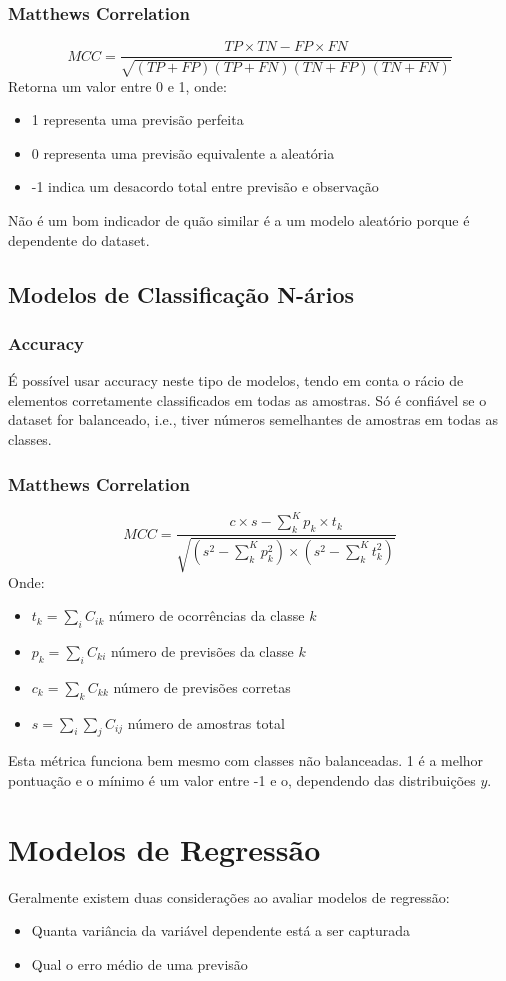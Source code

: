 \documentclass[10pt,a4paper]{report}
\begin{document}
\subsubsection{Matthews Correlation}
$$
MCC = \frac{TP \times TN - FP \times FN}{\sqrt{(TP + FP)(TP + FN)(TN + FP)(TN + FN)}}
$$
Retorna um valor entre 0 e 1, onde:
\begin{itemize}
\item 1 representa uma previsão perfeita
\item 0 representa uma previsão equivalente a aleatória
\item -1 indica um desacordo total entre previsão e observação
\end{itemize}
Não é um bom indicador de quão similar é a um modelo aleatório porque é dependente do dataset.
\subsection{Modelos de Classificação N-ários}
\subsubsection{Accuracy}
É possível usar accuracy neste tipo de modelos, tendo em conta o rácio de elementos corretamente classificados em todas as amostras. Só é confiável se o dataset for balanceado, i.e., tiver números semelhantes de amostras em todas as classes.
\subsubsection{Matthews Correlation}
$$
MCC = \frac{c \times s - \sum_{k}^K p_k \times t_k}{\sqrt{\left(s^2 - \sum_k^K p_k^2\right)\times \left(s^2 - \sum_k^K t_k^2\right)}}
$$
Onde:
\begin{itemize}
\item $t_k  = \sum_i C_{ik}$ número de ocorrências da classe $k$
\item $p_k  = \sum_i C_{ki}$ número de previsões da classe $k$
\item $c_k  = \sum_k C_{kk}$ número de previsões corretas
\item $s = \sum_i \sum_j C_{ij}$ número de amostras total
\end{itemize}
Esta métrica funciona bem mesmo com classes não balanceadas. 1 é a melhor pontuação e o mínimo é um valor entre -1 e o, dependendo das distribuições $y$.
\section{Modelos de Regressão}
Geralmente existem duas considerações ao avaliar modelos de regressão:
\begin{itemize}
\item Quanta variância da variável dependente está a ser capturada
\item Qual o erro médio de uma previsão
\end{itemize}
\end{document}
